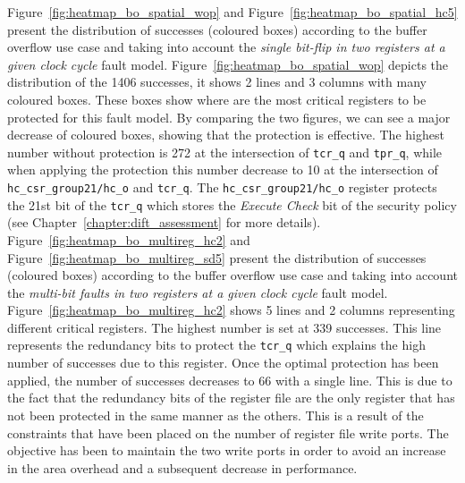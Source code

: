 Figure~\ref{fig:heatmap_bo_spatial_wop} and Figure~\ref{fig:heatmap_bo_spatial_hc5} present the distribution of successes (coloured boxes) according to the buffer overflow use case and taking into account the \textit{single bit-flip in two registers at a given clock cycle} fault model. Figure~\ref{fig:heatmap_bo_spatial_wop} depicts the distribution of the 1406 successes, it shows 2 lines and 3 columns with many coloured boxes. These boxes show where are the most critical registers to be protected for this fault model. By comparing the two figures, we can see a major decrease of coloured boxes, showing that the protection is effective. The highest number without protection is 272 at the intersection of \texttt{tcr\_q} and \texttt{tpr\_q}, while when applying the protection this number decrease to 10 at the intersection of \texttt{hc\_csr\_group21/hc\_o} and \texttt{tcr\_q}. The \texttt{hc\_csr\_group21/hc\_o} register protects the 21st bit of the \texttt{tcr\_q} which stores the \textit{Execute Check} bit of the security policy (see Chapter~\ref{chapter:dift_assessment} for more details).
Figure~\ref{fig:heatmap_bo_multireg_hc2} and Figure~\ref{fig:heatmap_bo_multireg_sd5} present the distribution of successes (coloured boxes) according to the buffer overflow use case and taking into account the \textit{multi-bit faults in two registers at a given clock cycle} fault model. Figure~\ref{fig:heatmap_bo_multireg_hc2} shows 5 lines and 2 columns representing different critical registers. The highest number is set at 339 successes. This line represents the redundancy bits to protect the \texttt{tcr\_q} which explains the high number of successes due to this register. Once the optimal protection has been applied, the number of successes decreases to 66 with a single line. This is due to the fact that the redundancy bits of the register file are the only register that has not been protected in the same manner as the others. This is a result of the constraints that have been placed on the number of register file write ports. The objective has been to maintain the two write ports in order to avoid an increase in the area overhead and a subsequent decrease in performance.

